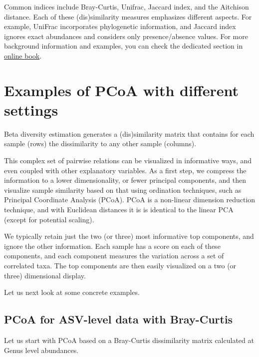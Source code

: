 \documentclass[
  oneside]{book}
\begin{document}
Common indices include Bray-Curtis, Unifrac, Jaccard index, and the
Aitchison distance. Each of these (dis)similarity measures emphasizes
different aspects. For example, UniFrac incorporates phylogenetic
information, and Jaccard index ignores exact abundances and considers
only presence/absence values. For more background information
and examples, you can check the dedicated section in \href{https://microbiome.github.io/OMA/microbiome-diversity.html\#beta-diversity}{online
book}.

\hypertarget{examples-of-pcoa-with-different-settings}{%
\section{Examples of PCoA with different settings}\label{examples-of-pcoa-with-different-settings}}

Beta diversity estimation generates a (dis)similarity matrix that
contains for each sample (rows) the dissimilarity to any other sample
(columns).

This complex set of pairwise relations can be visualized in
informative ways, and even coupled with other explanatory
variables. As a first step, we compress the information to a lower
dimensionality, or fewer principal components, and then visualize
sample similarity based on that using ordination techniques, such as
Principal Coordinate Analysis (PCoA). PCoA is a non-linear dimension
reduction technique, and with Euclidean distances it is is identical
to the linear PCA (except for potential scaling).

We typically retain just the two (or three) most informative top
components, and ignore the other information. Each sample has a score
on each of these components, and each component measures the variation
across a set of correlated taxa. The top components are then easily
visualized on a two (or three) dimensional display.

Let us next look at some concrete examples.

\hypertarget{pcoa-for-asv-level-data-with-bray-curtis}{%
\subsection{PCoA for ASV-level data with Bray-Curtis}\label{pcoa-for-asv-level-data-with-bray-curtis}}

Let us start with PCoA based on a Bray-Curtis dissimilarity matrix
calculated at Genus level abundances.
\end{document}
